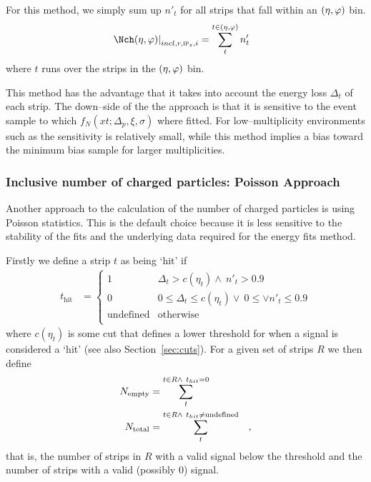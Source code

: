 \documentclass[compat,11pt]{alicenote}
\newcommand*{\etaphi}{\ensuremath(\eta,\varphi)}
\newcommand{\secref}[1]{Section~\ref{#1}}
\newcommand{\dndetadphi}[1][]{{\ensuremath%
    \ifx|#1|\else\left.\fi%
      \Nch\etaphi%
      \ifx|#1|\else\right|_{#1}\fi}}
\newcommand\Ntotal{{\ensuremath N_{\text{total}}}}
\newcommand\Nempty{{\ensuremath N_{\text{empty}}}}
\begin{document}
For this method, we simply sum up $n'_t$ for all strips that fall
within an $\etaphi$ bin.  
\begin{align}
  \label{eq:density1}
  \dndetadphi[incl,r,\subIPz,i] &= \sum_t^{t\in\etaphi} n'_t
\end{align}
where $t$ runs over the strips in the $\etaphi$ bin. 

This method has the advantage that it takes into account the energy
loss $\Delta_t$ of each strip.  The down--side of the the approach is
that it is sensitive to the event sample to which
$f_N(xt;\Delta_p,\xi,\sigma)$ where fitted.  For low--multiplicity
environments such as \ppCol{} the sensitivity is relatively small,
while this method implies a bias toward the minimum bias sample for
larger multiplicities. 

\subsubsection{Inclusive number of charged particles: Poisson Approach} 
\label{sec:sub:sub:poisson}

\newcommand\muR{\ensuremath\mu}
Another approach to the calculation of the number of charged particles
is using Poisson statistics. This is the default choice because it is
less sensitive to the stability of the fits and the underlying data
required for the energy fits method. 

Firstly we define a strip $t$ as being `hit' if 
\begin{align*}
  t_{\text{hit}} &= \left\{ 
    \begin{array}{cl}
      1 & \Delta_t > c(\eta_t) \wedge\ n'_t > 0.9\\
      0 & 0 \leq \Delta_t \leq c(\eta_t)\vee\  0 \leq \vee n'_t \leq 0.9\\
      \text{undefined} & \text{otherwise}\\ 
    \end{array}\right.
\end{align*}
where $c(\eta_t)$ is some cut that defines a lower threshold for when
a signal is considered a `hit' (see also \secref{sec:cuts}).  For a
given set of strips $R$ we then define 
\begin{align*}
  \Nempty{} &= \sum_t^{t\in R\wedge\ t_{hit}=0}\\
  \Ntotal{} &= \sum_t^{t\in R\wedge\ t_{hit}\neq\text{undefined}}\quad,\\
\end{align*}
that is, the number of strips in $R$ with a valid signal below the
threshold and the number of strips with a valid (possibly 0) signal. 
\end{document}
